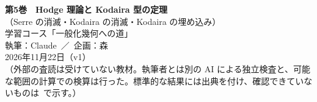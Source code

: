 
\usepackage{tikz}
\usepackage{tikz-cd}
\usetikzlibrary{arrows.meta,positioning,calc}
\newcommand{\Oc}{\mathcal O}
\newcommand{\CP}{\mathbb{CP}}
\newcommand{\Lef}{\mathsf L}          %
\newcommand{\Lam}{\Lambda}            %
\newcommand{\Hdg}{\mathcal H}         %
\newcommand{\Ker}{\operatorname{Ker}}
\newcommand{\Coker}{\operatorname{Coker}}
\newcommand{\NS}{\mathrm{NS}}
\newcommand{\Pf}{\mathrm{Pf}}
\newcommand{\Bl}{\mathrm{Bl}}
\newcommand{\bdry}{\partial}
\renewcommand{\Re}{\operatorname{Re}}
\renewcommand{\Im}{\operatorname{Im}}
\renewcommand{\contentsname}{目次}\renewcommand{\figurename}{図}
\usepackage{fontspec}\newfontfamily{}
\newcommand{\Cech}{{\lmfont \v{C}ech}}

\sloppy
\begin{center}
{\LARGE\bfseries\sffamily 第5巻　Hodge 理論と Kodaira 型の定理}\\[4pt]
{\large\sffamily （Serre の消滅・Kodaira の消滅・Kodaira の埋め込み）}\\[8pt]
{\large 学習コース「一般化幾何への道」}\\[6pt]
{\large 執筆：Claude\ ／\ 企画：森}\\[3pt]
2026年11月22日（v1）\\[3pt]
{\small （外部の査読は受けていない教材。執筆者とは別の AI による独立検査と、可能な範囲の計算での検算は行った。標準的な結果には出典を付け、確認できていないものは\tQ\ で示す。）}
\end{center}

